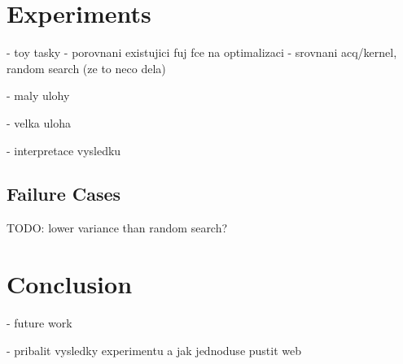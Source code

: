 \chapter{Experiments}
\label{chapter:experiments}

- toy tasky
  - porovnani existujici fuj fce na optimalizaci
  - srovnani acq/kernel, random search (ze to neco dela)

- maly ulohy

- velka uloha

- interpretace vysledku
\\

\section{Failure Cases}


TODO: lower variance than random search?

\chapter{Conclusion}

- future work

- pribalit vysledky experimentu a jak jednoduse pustit web
